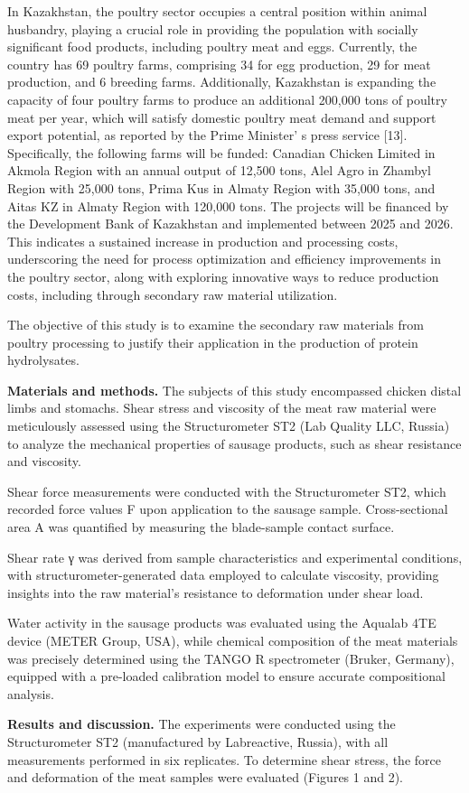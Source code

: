 \begin{multicols}{2}
In Kazakhstan, the poultry sector occupies a central position within
animal husbandry, playing a crucial role in providing the population
with socially significant food products, including poultry meat and
eggs. Currently, the country has 69 poultry farms, comprising 34 for egg
production, 29 for meat production, and 6 breeding farms. Additionally,
Kazakhstan is expanding the capacity of four poultry farms to produce an
additional 200,000 tons of poultry meat per year, which will satisfy
domestic poultry meat demand and support export potential, as reported
by the Prime Minister' s press service {[}13{]}.
Specifically, the following farms will be funded: Canadian Chicken
Limited in Akmola Region with an annual output of 12,500 tons, Alel Agro
in Zhambyl Region with 25,000 tons, Prima Kus in Almaty Region with
35,000 tons, and Aitas KZ in Almaty Region with 120,000 tons. The
projects will be financed by the Development Bank of Kazakhstan and
implemented between 2025 and 2026. This indicates a sustained increase
in production and processing costs, underscoring the need for process
optimization and efficiency improvements in the poultry sector, along
with exploring innovative ways to reduce production costs, including
through secondary raw material utilization.

The objective of this study is to examine the secondary raw materials
from poultry processing to justify their application in the production
of protein hydrolysates.

{\bfseries Materials and methods.} The subjects of this study encompassed
chicken distal limbs and stomachs. Shear stress and viscosity of the
meat raw material were meticulously assessed using the Structurometer
ST2 (Lab Quality LLC, Russia) to analyze the mechanical properties of
sausage products, such as shear resistance and viscosity.

Shear force measurements were conducted with the Structurometer ST2,
which recorded force values F upon application to the sausage sample.
Cross-sectional area A was quantified by measuring the blade-sample
contact surface.

Shear rate γ was derived from sample characteristics and experimental
conditions, with structurometer-generated data employed to calculate
viscosity, providing insights into the raw material's resistance to
deformation under shear load.

Water activity in the sausage products was evaluated using the Aqualab
4TE device (METER Group, USA), while chemical composition of the meat
materials was precisely determined using the TANGO R spectrometer
(Bruker, Germany), equipped with a pre-loaded calibration model to
ensure accurate compositional analysis.

{\bfseries Results and discussion.} The experiments were conducted using
the Structurometer ST2 (manufactured by Labreactive, Russia), with all
measurements performed in six replicates. To determine shear stress, the
force and deformation of the meat samples were evaluated (Figures 1 and
2).
\end{multicols}

